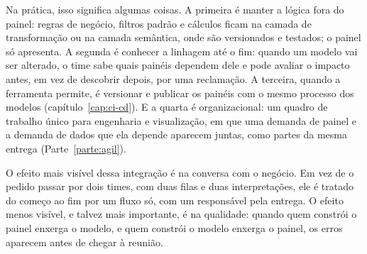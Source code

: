 Na prática, isso significa algumas coisas. A primeira é manter a lógica fora do painel: regras
de negócio, filtros padrão e cálculos ficam na camada de transformação ou na camada semântica,
onde são versionados e testados; o painel só apresenta. A segunda é conhecer a linhagem até o
fim: quando um modelo vai ser alterado, o time sabe quais painéis dependem dele e pode avaliar
o impacto antes, em vez de descobrir depois, por uma reclamação. A terceira, quando a
ferramenta permite, é versionar e publicar os painéis com o mesmo processo dos modelos
(capítulo~\ref{cap:ci-cd}). E a quarta é organizacional: um quadro de trabalho único para
engenharia e visualização, em que uma demanda de painel e a demanda de dados que ela depende
aparecem juntas, como partes da mesma entrega (Parte~\ref{parte:agil}).

O efeito mais visível dessa integração é na conversa com o negócio. Em vez de o pedido passar
por dois times, com duas filas e duas interpretações, ele é tratado do começo ao fim por um
fluxo só, com um responsável pela entrega. O efeito menos visível, e talvez mais importante, é
na qualidade: quando quem constrói o painel enxerga o modelo, e quem constrói o modelo
enxerga o painel, os erros aparecem antes de chegar à reunião.


\begin{leituras}
\end{leituras}
